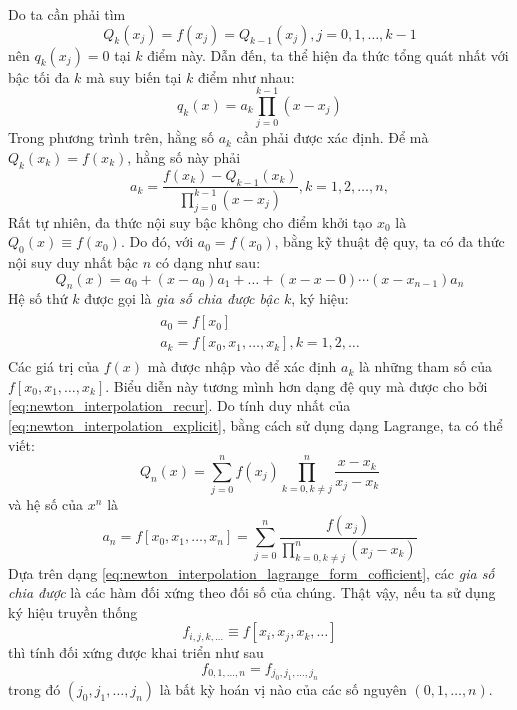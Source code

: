 Do ta cần phải tìm 
\begin{equation}
    Q_k(x_j) = f(x_j) = Q_{k-1}(x_j), j = 0, 1, \dots, k-1
\end{equation}
nên $q_k(x_j) = 0$ tại $k$ điểm này. Dẫn đến, ta thể hiện đa thức tổng quát nhất với bậc tối đa $k$ mà suy biến tại $k$ điểm như nhau:
\begin{equation}
    q_k(x) = a_k \prod_{j=0}^{k-1}(x -x_j)
\end{equation}
Trong phương trình trên, hằng số $a_k$ cần phải được xác định. Để mà $Q_k(x_k) = f(x_k)$, hằng số này phải
\begin{equation}
    a_k = \dfrac{f(x_k) - Q_{k-1}(x_k)}{\prod_{j=0}^{k-1}(x -x_j)}, k = 1, 2, \dots, n,
\end{equation}
Rất tự nhiên, đa thức nội suy bậc không cho điểm khởi tạo $x_0$ là $Q_0(x) \equiv f(x_0)$. Do đó, với $a_0 = f(x_0)$, bằng kỹ thuật đệ quy, ta có đa thức nội suy duy nhất bậc $n$ có dạng như sau:
\begin{equation}
    \label{eq:newton_interpolation_explicit}
    Q_n(x) = a_0 + (x-a_0)a_1 + \dots + (x-x-0)\cdots(x-x_{n-1})a_n
\end{equation}
Hệ số thứ $k$ được gọi là \emph{gia số chia được bậc $k$}, ký hiệu:
\begin{align}
    \begin{aligned}
        a_0 = f[x_0] \\
        a_k = f[x_0, x_1, \dots, x_k], k = 1, 2, \dots
    \end{aligned}
\end{align}
Các giá trị của $f(x)$ mà được nhập vào để xác định $a_k$ là những tham số của $f[x_0, x_1, \dots, x_k]$. Biểu diễn này tương mình hơn dạng đệ quy mà được cho bởi \eqref{eq:newton_interpolation_recur}. Do tính duy nhất của \eqref{eq:newton_interpolation_explicit}, bằng cách sử dụng dạng Lagrange, ta có thể viết:
\begin{equation}
    \label{eq:newton_interpolation_lagrange_form}
    Q_n(x) = \sum_{j = 0}^nf(x_j)\prod_{k=0, k \ne j}^n\frac{x-x_k}{x_j - x_k}
\end{equation}
và hệ số của $x^n$ là
\begin{equation}
    \label{eq:newton_interpolation_lagrange_form_cofficient}
    a_n = f[x_0, x_1, \dots, x_n] = \sum_{j = 0}^n\frac{f(x_j)}{\prod_{k=0, k \ne j}^n(x_j - x_k)}
\end{equation}
Dựa trên dạng \eqref{eq:newton_interpolation_lagrange_form_cofficient}, các \emph{gia số chia được} là các hàm đối xứng theo đối số của chúng. Thật vậy, nếu ta sử dụng ký hiệu truyền thống
\begin{equation}
    f_{i, j, k, \dots} \equiv f[x_i, x_j, x_k, \dots]
\end{equation}
thì tính đối xứng được khai triển như sau
\begin{equation}
    f_{0, 1, \dots, n} = f_{j_0, j_1, \dots, j_n}
\end{equation}
trong đó $(j_0, j_1, \dots, j_n)$ là bất kỳ hoán vị nào của các số nguyên $(0, 1, \dots, n)$.

